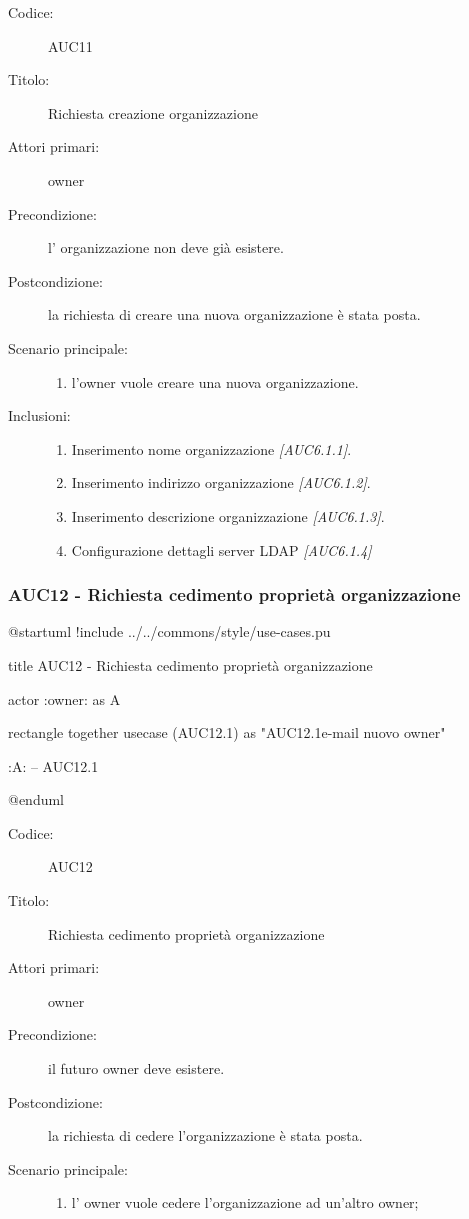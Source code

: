 \documentclass[casi-duso]{subfiles}
\begin{document}
\begin{description}
  \item[Codice:] AUC11
  \item[Titolo:] Richiesta creazione organizzazione
  \item[Attori primari:] owner
  \item[Precondizione:] l' organizzazione non deve già esistere.
  \item[Postcondizione:] la richiesta di creare una nuova organizzazione è stata posta.
  \item[Scenario principale:]
  \begin{enumerate}
    \item l'owner vuole creare una nuova organizzazione.
  \end{enumerate}
  \item[Inclusioni:]
  \begin{enumerate}
    \item Inserimento nome organizzazione \emph{[AUC6.1.1]}.
    \item Inserimento indirizzo organizzazione \emph{[AUC6.1.2]}.
    \item Inserimento descrizione organizzazione \emph{[AUC6.1.3]}.
    \item Configurazione dettagli server LDAP \emph{[AUC6.1.4]}
  \end{enumerate}
\end{description}

\subsubsection{AUC12 - Richiesta cedimento proprietà organizzazione}%
\label{subsub:AUC12}

\begin{plantuml}
@startuml 
!include ../../commons/style/use-cases.pu

title AUC12 - Richiesta cedimento proprietà organizzazione

actor :owner: as A

rectangle {
  together {
    usecase (AUC12.1) as "AUC12.1\nInserimento e-mail nuovo owner"
  }
}

:A: -- AUC12.1

@enduml
\end{plantuml}

\begin{description}
  \item[Codice:] AUC12
  \item[Titolo:] Richiesta cedimento proprietà organizzazione
  \item[Attori primari:] owner
  \item[Precondizione:] il futuro owner deve esistere.
  \item[Postcondizione:] la richiesta di cedere l'organizzazione è stata posta.
  \item[Scenario principale:] 
  \begin{enumerate}
    \item l' owner vuole cedere l'organizzazione ad un'altro owner;
  \end{enumerate}
\end{description}
\end{document}
